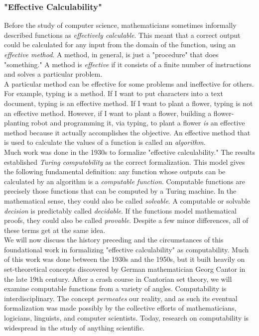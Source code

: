 \subsubsection{"Effective Calculability"}

Before the study of computer science, mathematicians sometimes informally described functions as \textit{effectively calculable}. This meant that a correct output could be calculated for any input from the domain of the function, using an \textit{effective method}. A method, in general, is just a "procedure" that does "something." A method is \textit{effective} if it consists of a finite number of instructions and solves a particular problem. \\

A particular method can be effective for some problems and ineffective for others. For example, typing is a method. If I want to put characters into a text document, typing is an effective method. If I want to plant a flower, typing is not an effective method. However, if I want to plant a flower, building a flower-planting robot and programming it, via typing, to plant a flower \textit{is} an effective method because it actually accomplishes the objective. An effective method that is used to calculate the values of a function is called an \textit{algorithm}. \\

Much work was done in the 1930s to formalize "effective calculability." The results established \textit{Turing computability} as the correct formalization. This model gives the following fundamental definition: any function whose outputs can be calculated by an algorithm is a \textit{computable function}. Computable functions are precisely those functions that can be computed by a Turing machine. In the mathematical sense, they could also be called \textit{solvable}. A computable or solvable \textit{decision} is predictably called \textit{decidable}. If the functions model mathematical proofs, they could also be called \textit{provable}. Despite a few minor differences, all of these terms get at the same idea. \\

We will now discuss the history preceding and the circumstances of this foundational work in formalizing "effective calculability" as computability. Much of this work was done between the 1930s and the 1950s, but it built heavily on set-theoretical concepts discovered by German mathematician Georg Cantor in the late 19th century. After a crash course in Cantorian set theory, we will examine computable functions from a variety of angles. Computability is interdisciplinary. The concept \textit{permeates} our reality, and as such its eventual formalization was made possibly by the collective efforts of mathematicians, logicians, linguists, and computer scientists. Today, research on computability is widespread in the study of anything scientific. \\

